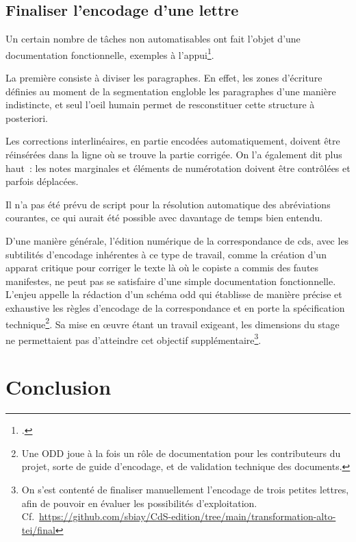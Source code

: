\documentclass[a4paper,12pt,twoside]{book}
\begin{document}
		\section{Finaliser l'encodage d'une lettre}
		
			Un certain nombre de tâches non automatisables ont fait l'objet d'une documentation fonctionnelle, exemples à l'appui\footcite{biayFinaliserEncodageLettre2022}.
			
			La première consiste à diviser les paragraphes. En effet, les zones d'écriture définies au moment de la \gls{segmentation} engloble les paragraphes d'une manière indistincte, et seul l'oeil humain permet de resconstituer cette structure à posteriori.
			
			Les corrections interlinéaires, en partie encodées automatiquement, doivent être réinsérées dans la ligne où se trouve la partie corrigée. On l'a également dit plus haut~: les notes marginales et éléments de numérotation doivent être contrôlées et parfois déplacées.
			
			Il n'a pas été prévu de script pour la résolution automatique des abréviations courantes, ce qui aurait été possible avec davantage de temps bien entendu. 
			
			D'une manière générale, l'édition numérique de la correspondance de \gls{cds}, avec les subtilités d'encodage inhérentes à ce type de travail, comme la création d'un apparat critique pour corriger le texte là où le copiste a commis des fautes manifestes, ne peut pas se satisfaire d'une simple documentation fonctionnelle. L'enjeu appelle la rédaction d'un schéma \gls{odd} qui établisse de manière précise et exhaustive les règles d'encodage de la correspondance et en porte la spécification technique\footnote{Une ODD joue à la fois un rôle de documentation pour les contributeurs du projet, sorte de guide d'encodage, et de validation technique des documents.}. Sa mise en œuvre étant un travail exigeant, les dimensions du stage ne permettaient pas d'atteindre cet objectif supplémentaire\footnote{On s'est contenté de finaliser manuellement l'encodage de trois petites lettres, afin de pouvoir en évaluer les possibilités d'exploitation. Cf.~\url{https://github.com/sbiay/CdS-edition/tree/main/transformation-alto-tei/final}}.
			
	\chapter*{Conclusion}
		
\end{document}

